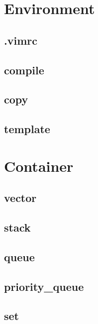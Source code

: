 \documentclass[a4paper, landscape, 8pt]{article}
\begin{document}
\begin{multicols*}{3}
\maketitle
\tableofcontents

\section{Environment}
\subsection{.vimrc}

\subsection{compile}

\subsection{copy}

\subsection{template}


\section{Container}
\subsection{vector}

\subsection{stack}

\subsection{queue}

\subsection{priority\_queue}

\subsection{set}


\end{multicols*}
\end{document}
